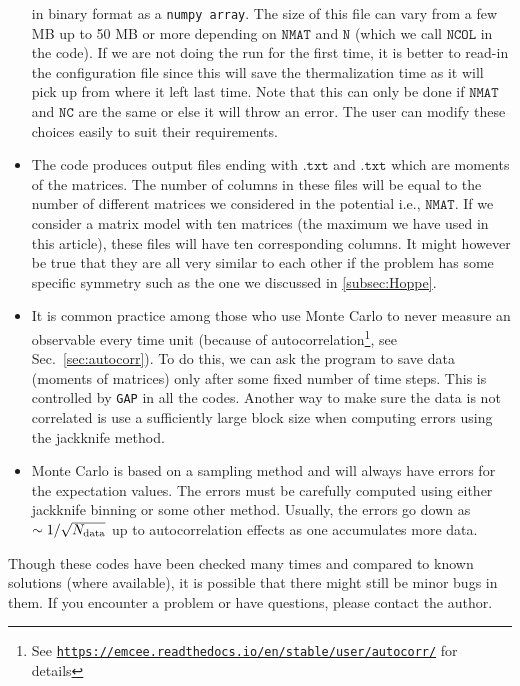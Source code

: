 \documentclass[letter,11pt]{article}
\begin{document}
\begin{itemize}
in binary format as a \texttt{numpy array}. 
The size of this file can vary from a few MB up to 50 MB or more depending on 
$\texttt{NMAT}$ and $\texttt{N}$ (which we call $\texttt{NCOL}$ in the code). If we are not doing the run for the first time, it is better to read-in the configuration file since this will save the thermalization time as it will pick up from where it left last time.  
Note that this can only be done if $\texttt{NMAT}$ and $\texttt{NC}$ are the same or else
it will throw an error. The user can modify these choices easily to suit their requirements. 
\item The code produces output files ending with $\texttt{.txt}$ and $\texttt{.txt}$
which are moments of the matrices. The number of columns in these files will be equal to 
the number of different matrices we considered in the potential i.e., $\texttt{NMAT}$. 
If we consider a matrix model with ten matrices (the maximum we have used in this article),
these files will have ten corresponding columns. It might however be true that they are all very similar to 
each other if the problem has some specific symmetry such as the one we discussed in \ref{subsec:Hoppe}.
\item It is common practice among those who use Monte Carlo to never measure an 
observable every time unit (because of autocorrelation\footnote{See 
\texttt{\href{https://emcee.readthedocs.io/en/stable/user/autocorr/}{https://emcee.readthedocs.io/en/stable/user/autocorr/}}
for details}, see Sec.~\ref{sec:autocorr}). 
To do this, we can ask the program to save data (moments of matrices) only after some fixed number of time steps. This is controlled by \texttt{GAP} in all the codes. Another way to make sure the data is not correlated is use a sufficiently large block size when computing errors using the jackknife method. 
\item Monte Carlo is based on a sampling method and will always have errors for the expectation values. The errors must be carefully computed using either jackknife binning or some other method. Usually, the errors go down as $ \sim 1/\sqrt{N_{\rm{data}}}$ up to autocorrelation effects 
as one accumulates more data. 
\end{itemize} 
Though these codes have been checked many times and compared to known solutions (where available), 
it is possible that there might still be minor bugs in them. If you encounter a problem or have questions, please contact the author. 
\vspace{8mm}
\end{document}
